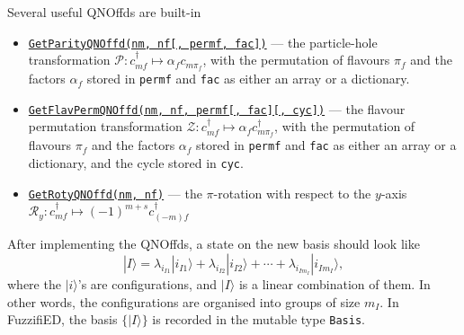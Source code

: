 \documentclass{timesjhep}
\begin{document}
Several useful QNOffds are built-in
\begin{itemize}
    \item \href{https://docs.fuzzified.world/models/\#FuzzifiED.GetParityQNOffd}{\lstinline|GetParityQNOffd(nm, nf[, permf, fac])|} --- the particle-hole transformation $\mathcal{P}:c^\dagger_{mf}\allowbreak\mapsto\alpha_fc_{m\pi_f}$, with the permutation of flavours $\pi_f$ and the factors $\alpha_f$ stored in \lstinline|permf| and \lstinline|fac| as either an array or a dictionary.
    \item \href{https://docs.fuzzified.world/models/\#FuzzifiED.GetFlavPermQNOffd}{\lstinline|GetFlavPermQNOffd(nm, nf, permf[, fac][, cyc])|} --- the flavour permutation transformation $\mathcal{Z}:c^\dagger_{mf}\mapsto\alpha_fc_{m\pi_f}^\dagger$, with the permutation of flavours $\pi_f$ and the factors $\alpha_f$ stored in \lstinline|permf| and \lstinline|fac| as either an array or a dictionary, and the cycle stored in \lstinline|cyc|.
    \item \href{https://docs.fuzzified.world/models/\#FuzzifiED.GetRotyQNOffd-Tuple{Int64,\%20Int64}}{\lstinline|GetRotyQNOffd(nm, nf)|} --- the $\pi$-rotation with respect to the $y$-axis $\mathcal{R}_y:c^\dagger_{mf}\mapsto(-1)^{m+s}c_{(-m)f}^\dagger$
\end{itemize}

After implementing the QNOffds, a state on the new basis should look like
\begin{equation}
    |I\rangle=\lambda_{i_{I1}}|i_{I1}\rangle+\lambda_{i_{I2}}|i_{I2}\rangle+\cdots+\lambda_{i_{Im_I}}|i_{Im_I}\rangle,
\end{equation}
where the $|i\rangle$'s are configurations, and $|I\rangle$ is a linear combination of them. In other words, the configurations are organised into groups of size $m_I$. In FuzzifiED, the basis $\{|I\rangle\}$ is recorded in the mutable type \lstinline|Basis|.
\end{document}
